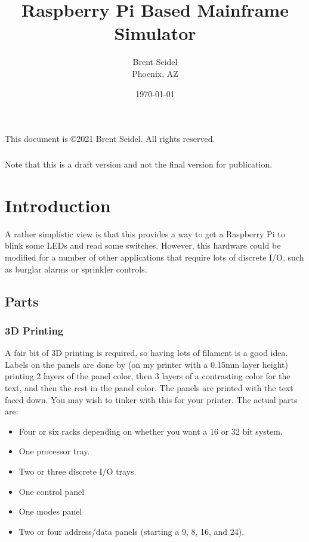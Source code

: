 \documentclass[10pt, openany]{book}
\title{Raspberry Pi Based Mainframe Simulator}
\author{Brent Seidel \\ Phoenix, AZ}
\date{ \today }
\begin{document}
%
%
\frontmatter
\maketitle
\begin{center}
This document is \copyright 2021 Brent Seidel.  All rights reserved.

\paragraph{}Note that this is a draft version and not the final version for publication.
\end{center}
\tableofcontents
\listoffigures

\mainmatter
\chapter{Introduction}
A rather simplistic view is that this provides a way to get a Raspberry Pi to blink some LEDs and read some switches.  However, this hardware could be modified for a number of other applications that require lots of discrete I/O, such as burglar alarms or sprinkler controls.

\section{Parts}
\subsection{3D Printing}
A fair bit of 3D printing is required, so having lots of filament is a good idea.  Labels on the panels are done by (on my printer with a 0.15mm layer height) printing 2 layers of the panel color, then 3 layers of a contrasting color for the text, and then the rest in the panel color.  The panels are printed with the text faced down.  You may wish to tinker with this for your printer.  The actual parts are:
\begin{itemize}
  \item Four or six racks depending on whether you want a 16 or 32 bit system.
  \item One processor tray.
  \item Two or three discrete I/O trays.
  \item One control panel
  \item One modes panel
  \item Two or four address/data panels (starting a 9, 8, 16, and 24).
\end{itemize}
\end{document}

